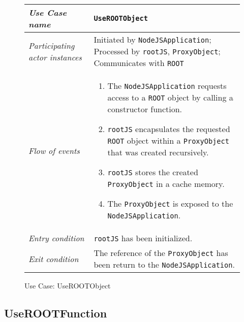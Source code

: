 \begin{figure}[htb]
	\centering
	\begin{longtable}{p{3cm} @{\hskip 1cm} p{12cm}}
		\hline
		
		\textit{Use Case name} & \texttt{UseROOTObject}\\
		\hline
		
		\textit{Participating actor instances} & 
		Initiated by \texttt{NodeJSApplication}; Processed by \texttt{rootJS}, \texttt{ProxyObject}; Communicates with \texttt{ROOT}\\
		\hline
		
		\textit{Flow of events} &
			\begin{enumerate}
				\item The \texttt{NodeJSApplication} requests access to a \texttt{ROOT} object by calling a constructor function.
				\item \texttt{rootJS} encapsulates the requested \texttt{ROOT} object within a \texttt{ProxyObject} that was created recursively.
				\item \texttt{rootJS} stores the created \texttt{ProxyObject} in a cache memory.
				\item The \texttt{ProxyObject} is exposed to the \texttt{NodeJSApplication}.
			\end{enumerate}
			\\
		\hline
		
		\textit{Entry condition} & \texttt{rootJS} has been initialized.\\
		\hline
		
		\textit{Exit condition} & The reference of the \texttt{ProxyObject} has been return to the \texttt{NodeJSApplication}.\\
        \hline
	\end{longtable}
	
	\caption{Use Case: UseROOTObject}
\end{figure}

\pagebreak

\subsection{UseROOTFunction}

